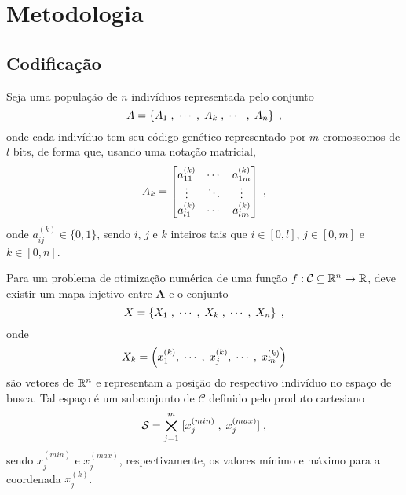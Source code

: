 \chapter{Metodologia}\label{cap_metodologia}

\section{Codificação}

\newcommand{\ak}[1]{a^{(k)}_{#1}}
\newcommand{\xk}[1]{x^{(k)}_{#1}}
\newcommand{\xmin}[1]{x^{(min)}_{#1}}
\newcommand{\xmax}[1]{x^{(max)}_{#1}}

Seja uma população de $n$ indivíduos representada pelo conjunto
\begin{equation}
  A = \left\{ A_1\;, \;\cdots\;,  \;A_k\;, \;\cdots\;, \;A_n \right\} \;\mathrm{,}
\end{equation}
onde cada indivíduo tem seu código genético representado por $m$ cromossomos
de $l$ bits, de forma que, usando uma notação matricial,
\begin{equation}
  A_k = \left[
    \begin{matrix}
      \ak{11} & \cdots & \ak{1m} \\
      \vdots  & \ddots & \vdots  \\
      \ak{l1} & \cdots & \ak{lm} \\
    \end{matrix}
    \right]
  \mathcomma
\end{equation}
onde $ \ak{ij} \in \{0,1\} $, sendo $i$, $j$ e $k$ inteiros tais que
$ i \in \left[ 0, l \right] $, $ j \in \left[ 0, m \right] $ e $ k \in \left[ 0, n \right] $.

Para um problema de otimização numérica de uma função $ f : \mathcal{C} \subseteq \mathbb{R}^n \rightarrow \mathbb{R} $,
deve existir um mapa injetivo entre $ \mathbf{A} $ e o conjunto
\begin{equation}
  X = \left\{ X_1 \; , \;\cdots\;,  \; X_k \; , \;\cdots\;, \; X_n \right\} \;\mathrm{,}
\end{equation}
onde
\begin{equation}
  X_k = \left( \xk{1}, \mathdots, \; \xk{j}, \mathdots, \; \xk{m} \right)
\end{equation}
são vetores de $ \mathbb{R}^n $ e representam a posição do respectivo indivíduo no espaço de busca.
Tal espaço é um subconjunto de $ \mathcal{C} $ definido pelo produto cartesiano
\begin{equation}
  \mathcal{S} = \bigtimes_{j = 1}^m \; [ \xmin{j} \; , \; \xmax{j} ] \mathcomma
\end{equation}
sendo $ \xmin{j} $ e $ \xmax{j} $, respectivamente, os valores mínimo e máximo para
a coordenada $ \xk{j} $.

